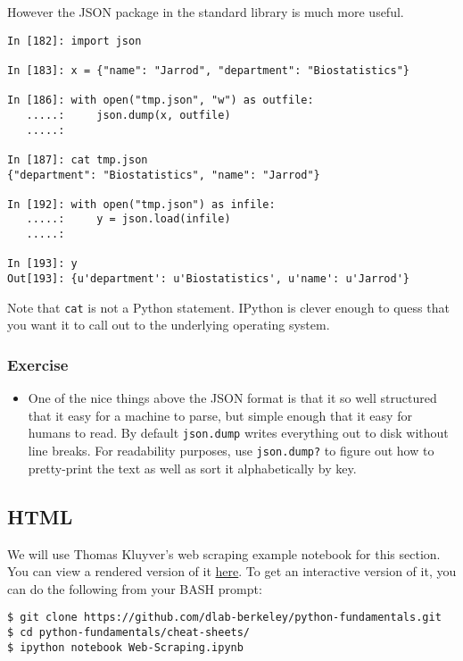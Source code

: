 However the JSON package in the standard library is much more useful.

\begin{verbatim}
In [182]: import json

In [183]: x = {"name": "Jarrod", "department": "Biostatistics"}

In [186]: with open("tmp.json", "w") as outfile: 
   .....:     json.dump(x, outfile)
   .....:     

In [187]: cat tmp.json
{"department": "Biostatistics", "name": "Jarrod"}

In [192]: with open("tmp.json") as infile:
   .....:     y = json.load(infile)
   .....:     

In [193]: y
Out[193]: {u'department': u'Biostatistics', u'name': u'Jarrod'}
\end{verbatim}

Note that \texttt{cat} is not a Python statement.  IPython is clever enough to
quess that you want it to call out to the underlying operating system.

\subsubsection{Exercise}
\begin{itemize}
\item One of the nice things above the JSON format is that it so well
  structured that it easy for a machine to parse, but simple enough
  that it easy for humans to read. By default \texttt{json.dump}
  writes everything out to disk without line breaks.  For readability
  purposes, use \texttt{json.dump?} to figure out how to pretty-print
  the text as well as sort it alphabetically by key.
\end{itemize}
\subsection{HTML}

We will use Thomas Kluyver's web scraping example notebook for this section.
You can view a rendered version of it
\href{http://nbviewer.ipython.org/github/dlab-berkeley/python-fundamentals/blob/master/cheat-sheets/Web-Scraping.ipynb}{here}.
To get an interactive version of it, you can do the following from your BASH prompt:

\begin{verbatim}
$ git clone https://github.com/dlab-berkeley/python-fundamentals.git
$ cd python-fundamentals/cheat-sheets/
$ ipython notebook Web-Scraping.ipynb
\end{verbatim}

